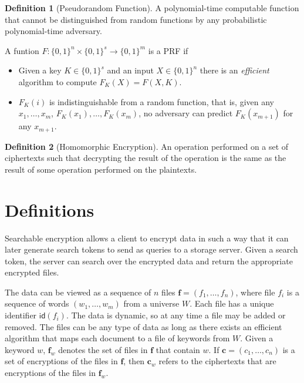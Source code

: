 \documentclass[12pt,a4paper]{article}
\theoremstyle{definition}
\newtheorem{definition}{Definition}
\begin{document}
\begin{definition}[Pseudorandom Function]
A polynomial-time computable function that cannot be distinguished from random
functions by any probabilistic polynomial-time adversary.

\noindent A funtion \(F \colon \{0,1\}^n \times \{0,1\}^s \rightarrow \{0,1\}^m\)
is a PRF if
\begin{itemize}
\item Given a key \(K\in\{0,1\}^s\) and an input \(X\in\{0,1\}^n\) there is an
	\emph{efficient} algorithm to compute \(F_K(X) = F(X, K)\).
\item \(F_K(i)\) is indistinguishable from a random function, that is,
	given any \(x_1,\dotsc,x_m\), \(F_K(x_1),\dotsc,F_K(x_m)\), no
	adversary can predict \(F_K(x_{m+1})\) for any \(x_{m+1}\).
\end{itemize}

\end{definition}


\begin{definition}[Homomorphic Encryption]
An operation performed on a set of ciphertexts such that decrypting
the result of the operation is the same as the result of some operation
performed on the plaintexts.
\end{definition}
\clearpage


\section{Definitions}

Searchable encryption allows a client to encrypt data in such a way that
it can later generate search tokens to send as queries to a storage
server. Given a search token, the server can search over the encrypted data
and return the appropriate encrypted files.

The data can be viewed as a sequence of \(n\) files
\(\mathbf{f} = (f_1, \dotsc, f_n)\), where file \(f_i\) is a sequence of words
\((w_1, \dotsc, w_m)\) from a universe \(W\). Each file
has a unique identifier \(\mathsf{id}(f_i)\). The data is dynamic, so at
any time a file may be added or removed. The files can be any type of data as
long as there exists an efficient algorithm that maps each document to a
file of keywords from \(W\). Given a
keyword \(w\), \(\mathbf{f}_w\) denotes the set of files in \(\mathbf{f}\)
that contain \(w\). If \(\mathbf{c} = (c_1 ,\dotsc, c_n)\) is a set of
encryptions of the files in \(\mathbf{f}\), then \(\mathbf{c}_w\) refers
to the ciphertexts that are encryptions of the files in \(\mathbf{f}_w\).
\end{document}
